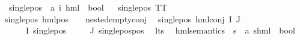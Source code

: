 \begin{isabellebody}
\isanewline
{}\isamarkupfalse%
\ single{\isacharunderscore}{\kern0pt}pos\ {\isacharcolon}{\kern0pt}{\isacharcolon}{\kern0pt}\ {\isachardoublequoteopen}{\isacharparenleft}{\kern0pt}{\isacharprime}{\kern0pt}a{\isacharcomma}{\kern0pt}\ {\isacharprime}{\kern0pt}i{\isacharparenright}{\kern0pt}\ hml\ {\isasymRightarrow}\ bool{\isachardoublequoteclose}\isanewline
\ \ \isanewline
{\isachardoublequoteopen}single{\isacharunderscore}{\kern0pt}pos\ TT{\isachardoublequoteclose}\ {\isacharbar}{\kern0pt}\isanewline
{\isachardoublequoteopen}single{\isacharunderscore}{\kern0pt}pos\ {\isacharparenleft}{\kern0pt}hml{\isacharunderscore}{\kern0pt}pos\ {\isacharunderscore}{\kern0pt}\ {\isasympsi}{\isacharparenright}{\kern0pt}{\isachardoublequoteclose}\ \ {\isachardoublequoteopen}nested{\isacharunderscore}{\kern0pt}empty{\isacharunderscore}{\kern0pt}conj\ {\isasympsi}{\isachardoublequoteclose}\ {\isacharbar}{\kern0pt}\isanewline
{\isachardoublequoteopen}single{\isacharunderscore}{\kern0pt}pos\ {\isacharparenleft}{\kern0pt}hml{\isacharunderscore}{\kern0pt}conj\ I\ J\ {\isasymPhi}{\isacharparenright}{\kern0pt}{\isachardoublequoteclose}\isanewline
{}\ {\isachardoublequoteopen}{\isasymforall}{\isasymphi}\ {\isasymin}\ {\isacharparenleft}{\kern0pt}{\isasymPhi}\ {\isacharbackquote}{\kern0pt}\ I{\isacharparenright}{\kern0pt}{\isachardot}{\kern0pt}\ {\isacharparenleft}{\kern0pt}single{\isacharunderscore}{\kern0pt}pos\ {\isasymphi}{\isacharparenright}{\kern0pt}{\isachardoublequoteclose}\isanewline
{\isachardoublequoteopen}{\isasymforall}{\isasymphi}\ {\isasymin}\ {\isacharparenleft}{\kern0pt}{\isasymPhi}\ {\isacharbackquote}{\kern0pt}\ J{\isacharparenright}{\kern0pt}{\isachardot}{\kern0pt}\ single{\isacharunderscore}{\kern0pt}pos{\isacharunderscore}{\kern0pt}pos\ {\isasymphi}{\isachardoublequoteclose}\isanewline
\isanewline
{}\isamarkupfalse%
\ lts\ \isanewline
\isanewline
{}\isamarkupfalse%
\ hml{\isacharunderscore}{\kern0pt}semantics\ {\isacharcolon}{\kern0pt}{\isacharcolon}{\kern0pt}\ {\isacartoucheopen}{\isacharprime}{\kern0pt}s\ {\isasymRightarrow}\ {\isacharparenleft}{\kern0pt}{\isacharprime}{\kern0pt}a{\isacharcomma}{\kern0pt}\ {\isacharprime}{\kern0pt}s{\isacharparenright}{\kern0pt}hml\ {\isasymRightarrow}\ bool{\isacartoucheclose}\isanewline
{\isacharparenleft}{\kern0pt}{\isacartoucheopen}{\isacharunderscore}{\kern0pt}\ {\isasymTurnstile}\ {\isacharunderscore}{\kern0pt}{\isacartoucheclose}\ {\isacharbrackleft}{\kern0pt}{}{}{\isacharcomma}{\kern0pt}\ {}{}{\isacharbrackright}{\kern0pt}\ {}{}{\isacharparenright}{\kern0pt}\isanewline

\end{isabellebody}
